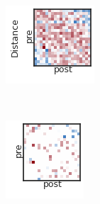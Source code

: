 \begin{figure}[t!]
\begin{subfigure}[b]{1.10in}
  \end{subfigure}
  \\
  \vspace{-.1in}
  \hspace{1em}
  \begin{subfigure}[b]{1.25in}
    \centering
    \includegraphics[width=\textwidth]{figures/ch3/Dense-Distance.png}
  \end{subfigure}
  ~
  \hspace{-.1in}
  \begin{subfigure}[b]{1.10in}
    \centering
    \includegraphics[width=\textwidth]{figures/ch3/Bernoulli-Distance.png}

\end{subfigure}
\end{figure}
